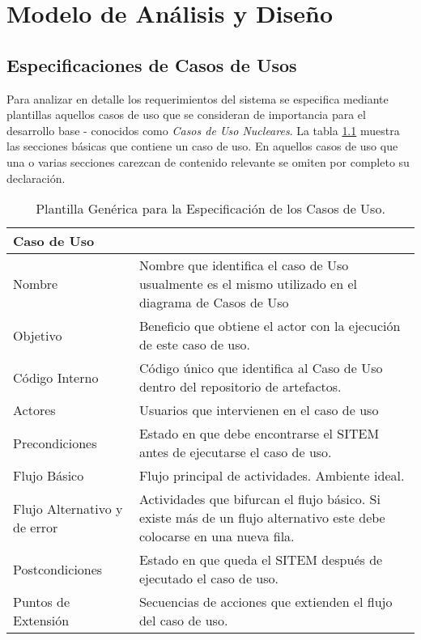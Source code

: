 \chapter{Modelo de Análisis y Diseño}
\label{modelo_analisis}
\section{Especificaciones de Casos de Usos}

Para analizar en detalle los requerimientos del sistema se especifica mediante plantillas aquellos casos de uso que se consideran de importancia para el desarrollo base - conocidos como \textit{Casos de Uso Nucleares}. La tabla \ref{tabla_plantilla} muestra las secciones básicas que contiene un caso de uso. En aquellos casos de uso que una o varias secciones carezcan de contenido relevante se omiten por completo su declaración.

\begin{table}
\begin{center}
\begin{tabular}{|l|p{10cm}|}
\hline
\textbf{Caso de Uso}&\\
\hline
Nombre & Nombre que identifica el caso de Uso usualmente es el mismo utilizado en el diagrama de Casos de Uso\\
\hline
Objetivo & Beneficio que obtiene el actor con la ejecución de este caso de uso.\\
\hline
Código Interno & Código único que identifica al Caso de Uso dentro del repositorio de artefactos.\\
\hline
Actores & Usuarios que intervienen en el caso de uso\\
\hline
Precondiciones & Estado en que debe encontrarse el SITEM antes de ejecutarse el caso de uso.\\
\hline
Flujo Básico & Flujo principal de actividades. Ambiente ideal.\\
\hline
Flujo Alternativo y de error & Actividades que bifurcan el flujo básico. Si existe más de un flujo alternativo este debe colocarse en una nueva fila.\\
\hline
Postcondiciones & Estado en que queda el SITEM después de ejecutado el caso de uso.\\
\hline
Puntos de Extensión & Secuencias de acciones que extienden el flujo del caso de uso.\\
\hline
\end{tabular}
\caption{Plantilla Genérica para la Especificación de los Casos de Uso.}
\label{tabla_plantilla} 
\end{center}
\end{table}


